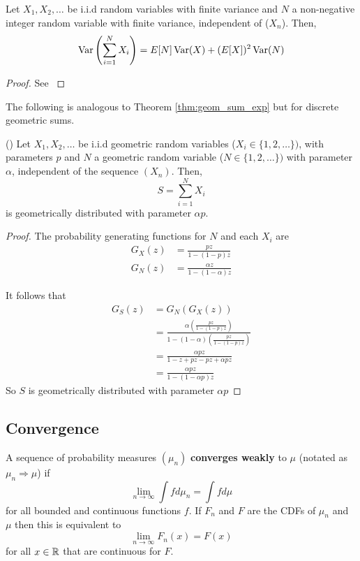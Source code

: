 \begin{theorem} \label{thm:random_sum_var}
Let $X_1, X_2, \ldots$ be i.i.d random variables with finite variance and $N$ a non-negative integer random variable with finite variance, independent of ($X_n$).
Then,
$$
\operatorname {Var}\left( \sum_{i = 1}^N X_i \right) = E[N]\operatorname {Var}(X) + (E[X])^2 \operatorname {Var}(N)
$$
\end{theorem}

\begin{proof}
See \cite{Ross97}
\end{proof}

The following is analogous to Theorem \ref{thm:geom_sum_exp} but for discrete geometric sums.

\begin{theorem}\label{thm:geom_sum_geom} (\cite{Nelson1995})
Let $X_1, X_2, \ldots$ be i.i.d geometric random variables ($X_i \in \{1,2,\ldots\})$, with parameters $p$ and $N$ a geometric random variable ($N \in \{1,2,\ldots\})$ with parameter $\alpha$, independent of the sequence $(X_n)$.
Then,
$$
S = \sum_{i = 1}^N X_i
$$
is geometrically distributed with parameter $\alpha p$.
\end{theorem}

\begin{proof}
The probability generating functions for $N$ and each $X_i$ are
\begin{align*}
    G_X(z) &= \frac{p z}{1 - (1 - p)z}\\
    G_{N}(z) &= \frac{\alpha z}{1 - (1 - \alpha)z}
\end{align*}

It follows that
\begin{align*}
    G_S(z) &= G_N(G_X(z))\\
    &= \frac{
    \alpha \left( \frac{p z}{1 - (1 - p)z} \right)
    }{
        1 - (1 - \alpha) \left( \frac{p z}{1 - (1 - p)z} \right)
    }\\
    &= \frac{
        \alpha p z
    }{
        1 - z + pz - pz + \alpha p z
    } \\
    &= \frac{
        \alpha p z
    }{
        1 - (1 - \alpha p) z
    }
\end{align*}
So $S$ is geometrically distributed with parameter $\alpha p$
\end{proof}

\subsection{Convergence}

\begin{defn}
A sequence of probability measures $(\mu_n)$ \textbf{converges weakly} to $\mu$ (notated as $\mu_n \Rightarrow \mu$) if
$$
\lim_{n \to \infty} \int f d\mu_n = \int f d\mu
$$
for all bounded and continuous functions $f$.
If $F_n$ and $F$ are the CDFs of $\mu_n$ and $\mu$ then this is equivalent to
$$
\lim_{n \to \infty} F_n(x) = F(x)
$$
for all $x \in \mathbb{R}$ that are continuous for $F$.
\end{defn}

